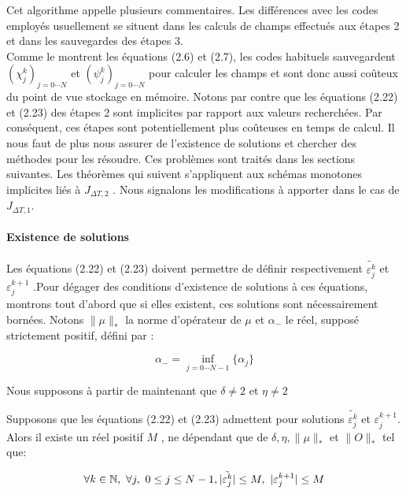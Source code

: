 Cet algorithme appelle plusieurs commentaires. Les différences avec les codes employés usuellement se situent dans les calculs de champs effectués aux étapes 2 et dans les sauvegardes des étapes 3.
\\Comme le montrent les équations (2.6) et (2.7), les codes habituels sauvegardent $ (\chi_j^k)_{j = 0\cdots N} $ et $ (\psi_j^k)_{j = 0\cdots N} $ pour calculer les champs et sont donc aussi coûteux du point de vue stockage en mémoire. Notons par contre que les équations (2.22) et (2.23) des étapes 2 sont implicites par rapport aux valeurs recherchées. Par conséquent, ces étapes sont potentiellement plus coûteuses en temps de calcul. Il nous faut de plus nous assurer de l'existence de solutions et chercher des méthodes pour les résoudre. Ces problèmes sont traités dans les sections suivantes. Les théorèmes qui suivent s’appliquent aux schémas monotones implicites liés à $ J_{\Delta T,2} $ . Nous signalons les modifications à apporter dans le cas de $ J_{\Delta T,1} $.

\paragraph*{Existence de solutions}
$ $\\
Les équations (2.22) et (2.23) doivent permettre de définir respectivement $ \tilde{\varepsilon^k_j} $ et $ \varepsilon_j^{k+1} $ .Pour dégager des conditions d'existence de solutions à ces équations, montrons tout d'abord que si elles existent, ces solutions sont nécessairement bornées. Notons $ \lVert \mu \rVert_* $ la
norme d'opérateur de $\mu$ et $\alpha_-$ le réel, supposé strictement positif, défini par :

$$ \alpha_- = \inf_{j = 0\cdots N-1}\{ \alpha_j \} $$

Nous supposons à partir de maintenant que $\delta \neq 2$ et $\eta \neq 2$

\begin{theorem}
	Supposons que les équations (2.22) et (2.23) admettent pour solutions $ \tilde{\varepsilon^k_j} $ et $ \varepsilon_j^{k+1} $. Alors il existe un réel positif $M$ , ne dépendant que de $\delta,\eta,\lVert \mu \rVert_*$ et $\lVert O \rVert_*$ tel que:
	
	$$ \forall k \in \mathbb N,\  \forall j,\  0 \leq j \leq N-1, |\tilde{\varepsilon^k_j}|\leq M,\ |\varepsilon_j^{k+1}| \leq M$$
	
\end{theorem}

